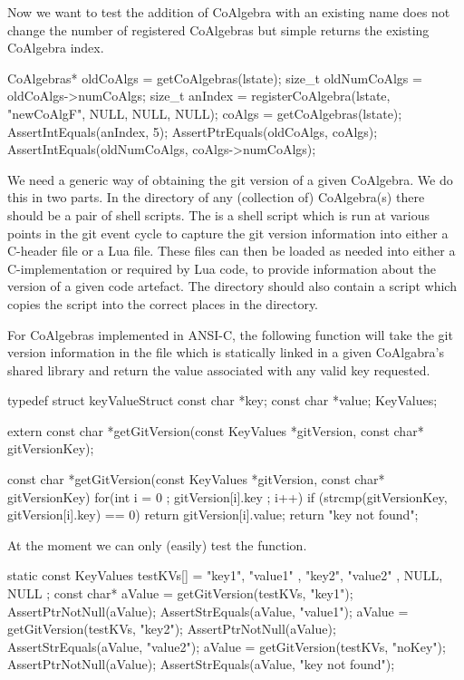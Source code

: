 Now we want to test the addition of CoAlgebra with an existing name does 
not change the number of registered CoAlgebras but simple returns the 
existing CoAlgebra index. 

\startCTest
  CoAlgebras* oldCoAlgs = getCoAlgebras(lstate);
  size_t oldNumCoAlgs = oldCoAlgs->numCoAlgs;
  size_t anIndex = 
    registerCoAlgebra(lstate, "newCoAlgF", NULL, NULL, NULL);
  coAlgs = getCoAlgebras(lstate);
  AssertIntEquals(anIndex, 5);
  AssertPtrEquals(oldCoAlgs, coAlgs);
  AssertIntEquals(oldNumCoAlgs, coAlgs->numCoAlgs);
\stopCTest
\stopTestCase
\stopTestSuite

\startTestSuite[getGitVersion]

We need a generic way of obtaining the git version of a given CoAlgebra. 
We do this in two parts. In the  directory of any (collection 
of) CoAlgebra(s) there should be a pair of shell scripts. The 
 is a  shell script which is run at various 
points in the git event cycle to capture the git version information into 
either a C-header file or a Lua file. These files can then be loaded as 
needed into either a C-implementation or required by Lua code, to provide 
information about the version of a given code artefact. The  
directory should also contain a   script 
which copies the  script into the correct places in the 
 directory. 

For CoAlgebras implemented in ANSI-C, the following function will take the 
git version information in the  file which is 
statically linked in a given CoAlgabra's shared library and return the 
value associated with any valid key requested. 

\startCHeader
typedef struct keyValueStruct {
  const char *key;
  const char *value;
} KeyValues;

extern const char *getGitVersion(const KeyValues *gitVersion, 
                                 const char* gitVersionKey);
\stopCHeader

\startCCode
const char *getGitVersion(const KeyValues *gitVersion,
                          const char* gitVersionKey) {
  for(int i = 0 ; gitVersion[i].key ; i++) {
    if (strcmp(gitVersionKey, gitVersion[i].key) == 0) {
      return gitVersion[i].value;
    }
  }
  return "key not found";
}
\stopCCode

At the moment we can only (easily) test the  function.

\startCTest
  static const KeyValues testKVs[] = {
    { "key1", "value1" },
    { "key2", "value2" },
    { NULL,   NULL }
  };
  const char* aValue = getGitVersion(testKVs, "key1");
  AssertPtrNotNull(aValue);
  AssertStrEquals(aValue, "value1");
  aValue = getGitVersion(testKVs, "key2");
  AssertPtrNotNull(aValue);
  AssertStrEquals(aValue, "value2");
  aValue = getGitVersion(testKVs, "noKey");
  AssertPtrNotNull(aValue);
  AssertStrEquals(aValue, "key not found");
\stopCTest
\stopTestCase
\stopTestSuite

